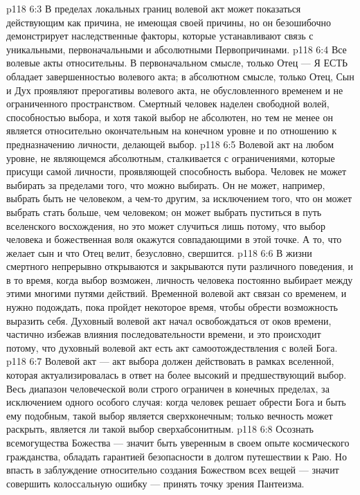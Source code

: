 \vs p118 6:3 \pc В пределах локальных границ волевой акт может показаться действующим как причина, не имеющая своей причины, но он безошибочно демонстрирует наследственные факторы, которые устанавливают связь с уникальными, первоначальными и абсолютными Первопричинами.
\vs p118 6:4 Все волевые акты относительны. В первоначальном смысле, только Отец --- Я ЕСТЬ обладает завершенностью волевого акта; в абсолютном смысле, только Отец, Сын и Дух проявляют прерогативы волевого акта, не обусловленного временем и не ограниченного пространством. Смертный человек наделен свободной волей, способностью выбора, и хотя такой выбор не абсолютен, но тем не менее он является относительно окончательным на конечном уровне и по отношению к предназначению личности, делающей выбор.
\vs p118 6:5 Волевой акт на любом уровне, не являющемся абсолютным, сталкивается с ограничениями, которые присущи самой личности, проявляющей способность выбора. Человек не может выбирать за пределами того, что можно выбирать. Он не может, например, выбрать быть не человеком, а чем\hyp{}то другим, за исключением того, что он может выбрать стать больше, чем человеком; он может выбрать пуститься в путь вселенского восхождения, но это может случиться лишь потому, что выбор человека и божественная воля окажутся совпадающими в этой точке. А то, что желает сын и что Отец велит, безусловно, свершится.
\vs p118 6:6 В жизни смертного непрерывно открываются и закрываются пути различного поведения, и в то время, когда выбор возможен, личность человека постоянно выбирает между этими многими путями действий. Временной волевой акт связан со временем, и нужно подождать, пока пройдет некоторое время, чтобы обрести возможность выразить себя. Духовный волевой акт начал освобождаться от оков времени, частично избежав влияния последовательности времени, и это происходит потому, что духовный волевой акт есть акт самоотождествления с волей Бога.
\vs p118 6:7 Волевой акт --- акт выбора должен действовать в рамках вселенной, которая актуализировалась в ответ на более высокий и предшествующий выбор. Весь диапазон человеческой воли строго ограничен в конечных пределах, за исключением одного особого случая: когда человек решает обрести Бога и быть ему подобным, такой выбор является сверхконечным; только вечность может раскрыть, является ли такой выбор сверхабсонитным.
\vs p118 6:8 \pc Осознать всемогущества Божества --- значит быть уверенным в своем опыте космического гражданства, обладать гарантией безопасности в долгом путешествии к Раю. Но впасть в заблуждение относительно создания Божеством всех вещей --- значит совершить колоссальную ошибку --- принять точку зрения Пантеизма.
